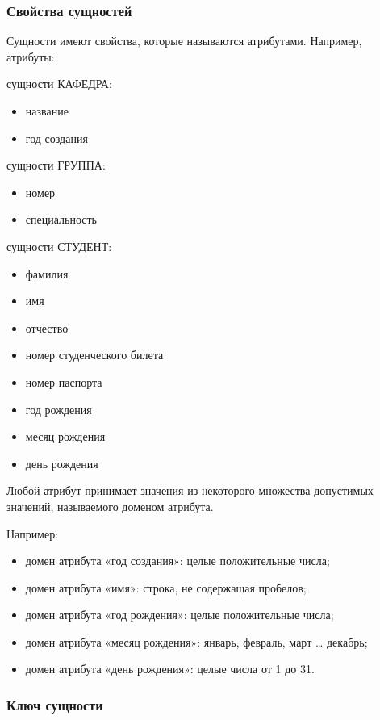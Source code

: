 \documentclass[a4paper]{article}
\begin{document}
\subsubsection{Свойства сущностей}
Сущности имеют свойства, которые называются атрибутами.
Например, атрибуты:

сущности КАФЕДРА:
    \begin{itemize}
      \item название
      \item год создания
    \end{itemize}

сущности ГРУППА:
\begin{itemize}
    \item номер
    \item специальность
\end{itemize}

сущности СТУДЕНТ:
\begin{itemize}
\item фамилия
\item имя
\item отчество
\item номер студенческого билета
\item номер паспорта
\item год рождения
\item месяц рождения
\item день рождения
\end{itemize}

Любой атрибут принимает значения из некоторого множества допустимых значений, называемого доменом атрибута.

Например:
\begin{itemize}
  \item домен атрибута «год создания»: целые положительные числа;
    \item домен атрибута «имя»: строка, не содержащая пробелов;
    \item домен атрибута «год рождения»: целые положительные числа;
    \item домен атрибута «месяц рождения»: январь, февраль, март … декабрь;
    \item домен атрибута «день рождения»: целые числа от 1 до 31.
\end{itemize}

\subsubsection{Ключ сущности}
\end{document}
